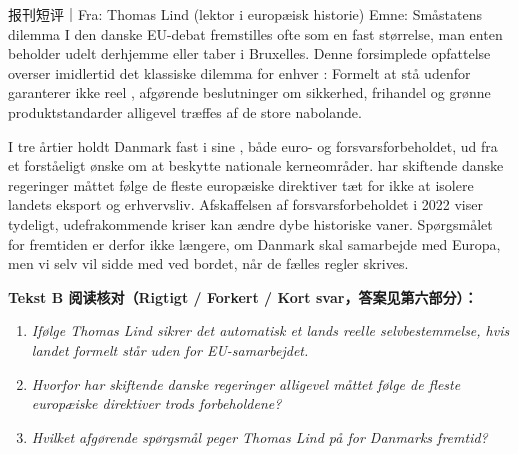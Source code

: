 \begin{emailbox}{报刊短评｜Fra: Thomas Lind (lektor i europæisk historie) \quad Emne: Småstatens dilemma}
I den danske EU-debat fremstilles  ofte som en fast størrelse, man enten beholder udelt derhjemme eller taber i Bruxelles. Denne forsimplede opfattelse overser imidlertid det klassiske dilemma for enhver : Formelt at stå udenfor garanterer ikke reel ,  afgørende beslutninger om sikkerhed, frihandel og grønne produktstandarder alligevel træffes af de store nabolande.

I tre årtier holdt Danmark fast i sine ,  både euro- og forsvarsforbeholdet, ud fra et forståeligt ønske om at beskytte nationale kerneområder.  har skiftende danske regeringer måttet følge de fleste europæiske direktiver tæt for ikke at isolere landets eksport og erhvervsliv. Afskaffelsen af forsvarsforbeholdet i 2022 viser tydeligt,  udefrakommende kriser kan ændre dybe historiske vaner. Spørgsmålet for fremtiden er derfor ikke længere, om Danmark skal samarbejde med Europa, men  vi selv vil sidde med ved bordet, når de fælles regler skrives.
\end{emailbox}

\textbf{Tekst B 阅读核对（Rigtigt / Forkert / Kort svar，答案见第六部分）：}
\begin{enumerate}
  \item \textit{Ifølge Thomas Lind sikrer det automatisk et lands reelle selvbestemmelse, hvis landet formelt står uden for EU-samarbejdet.} \underline{\hspace{2.2cm}}
  \item \textit{Hvorfor har skiftende danske regeringer alligevel måttet følge de fleste europæiske direktiver trods forbeholdene?} \underline{\hspace{2.2cm}}
  \item \textit{Hvilket afgørende spørgsmål peger Thomas Lind på for Danmarks fremtid?} \underline{\hspace{2.2cm}}
\end{enumerate}

